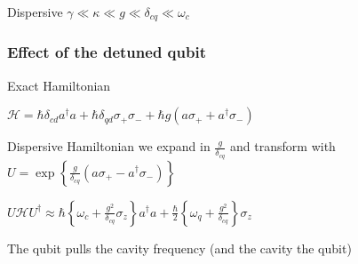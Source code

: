 \documentclass{beamer}
\begin{document}
\begin{frame}

    

\end{frame}
\begin{frame}

    \begin{block}{Dispersive}
        $
        \gamma \ll \kappa \ll g \ll \delta_{cq} \ll \omega_c
        $
    \end{block}

\end{frame}
\begin{frame}

    \frametitle{Effect of the detuned qubit}

    \begin{block}{Exact Hamiltonian}

        $
        \mathscr{H} = \hbar \delta_{cd} a^\dagger a + 
        \hbar \delta_{qd}\sigma_+ \sigma_- + 
        \hbar g ( a \sigma_+ + a^\dagger \sigma_- ) 
        $

    \end{block}
    \begin{block}{Dispersive Hamiltonian}
        we expand in $\frac{g}{\delta_{cq}}$ and transform with 
        $
        U = \exp \left \{\frac{g}{\delta_{cq}} 
            ( a \sigma_+ - a ^ \dagger \sigma_- ) \right \}
        $

        $ 
        U\mathscr{H}U ^ \dagger \approx \hbar 
        \left\{ \omega_c + \frac{g^2}{\delta_{cq}} \sigma_z \right\}
        a ^ \dagger a + 
        \frac{\hbar}{2} \left\{ \omega_q + \frac{g^2}{\delta_{cq}} \right\}
        \sigma_z 
        $
    
    The qubit pulls the cavity frequency (and the cavity the qubit)

    \end{block}

\end{frame}
\end{document}
